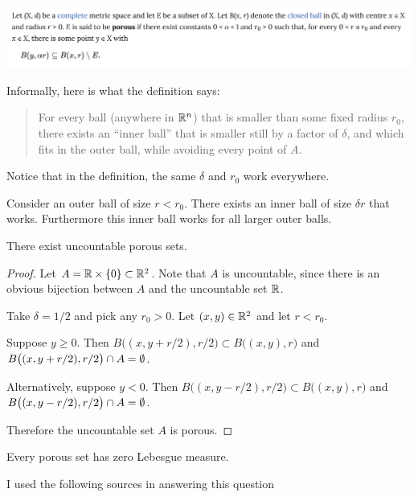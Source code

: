 \begin{mdframed}
  \includegraphics[width=400pt]{img/analysis--berkeley-202a-final-b463.png}
\end{mdframed}

Informally, here is what the definition says:

\begin{quote}
  For every ball (anywhere in $\mathbb{R}^n$) that is smaller than some fixed radius $r_0$, there exists an ``inner
  ball​'' that is smaller still by a factor of $\delta$, and which fits in the outer ball, while avoiding every
  point of $A$.
\end{quote}

Notice that in the definition, the same $\delta$ and $r_0$ work everywhere.

Consider an outer ball of size $r < r_0$. There exists an inner ball of size $\delta r$ that works. Furthermore
this inner ball works for all larger outer balls.

\begin{claim}
  There exist uncountable porous sets.
\end{claim}

\begin{proof}
  Let $A = \mathbb{R} \times \{0\} \subset \mathbb{R}^2$. Note that $A$ is uncountable, since there is an obvious bijection
  between $A$ and the uncountable set $\mathbb{R}$.

  Take $\delta = 1/2$ and pick any $r_0 > 0$. Let $(x, y) \in \mathbb{R}^2$ and let $r < r_0$.

  Suppose $y \geq 0$. Then $B\big((x, y + r/2), r/2\big) \subset B\big((x, y), r\big)$
  and $B\big((x, y + r/2), r/2\big) \cap A = \emptyset$.

  Alternatively, suppose $y < 0$. Then $B\big((x, y - r/2), r/2\big) \subset B\big((x, y), r\big)$
  and $B\big((x, y - r/2), r/2\big) \cap A = \emptyset$.

  Therefore the uncountable set $A$ is porous.
\end{proof}

\begin{claim}
  Every porous set has zero Lebesgue measure.
\end{claim}

I used the following sources in answering this question

